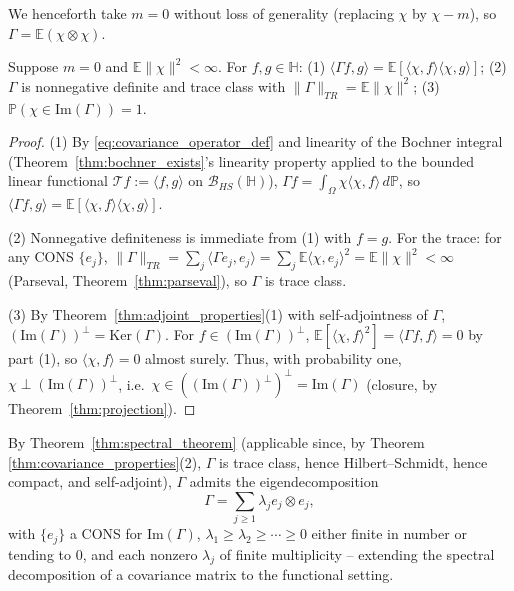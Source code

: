 We henceforth take $m=0$ without loss of generality (replacing $\chi$ by
$\chi-m$), so $\Gamma=\mathbb{E}(\chi\otimes\chi)$.

\begin{theorem}
\label{thm:covariance_properties}
Suppose $m=0$ and $\mathbb{E}\|\chi\|^2<\infty$. For $f,g\in\mathbb{H}$:
(1) $\langle\Gamma f,g\rangle = \mathbb{E}[\langle\chi,f\rangle\langle
\chi,g\rangle]$; (2) $\Gamma$ is nonnegative definite and trace class with
$\|\Gamma\|_{TR}=\mathbb{E}\|\chi\|^2$; (3) $\mathbb{P}(\chi\in
\mathrm{Im}(\Gamma))=1$.
\end{theorem}

\begin{proof}
(1) By \eqref{eq:covariance_operator_def} and linearity of the Bochner
integral (Theorem~\ref{thm:bochner_exists}'s linearity property applied to
the bounded linear functional $\mathcal{T}f:=\langle f,g\rangle$ on
$\mathcal{B}_{HS}(\mathbb{H})$), $\Gamma f = \int_\Omega\chi\langle\chi,f
\rangle\,d\mathbb{P}$, so $\langle\Gamma f,g\rangle = \mathbb{E}[\langle
\chi,f\rangle\langle\chi,g\rangle]$.

(2) Nonnegative definiteness is immediate from (1) with $f=g$. For the
trace: for any CONS $\{e_j\}$, $\|\Gamma\|_{TR} = \sum_j\langle\Gamma e_j,
e_j\rangle = \sum_j\mathbb{E}\langle\chi,e_j\rangle^2 = \mathbb{E}\|\chi
\|^2<\infty$ (Parseval, Theorem~\ref{thm:parseval}), so $\Gamma$ is trace
class.

(3) By Theorem~\ref{thm:adjoint_properties}(1) with self-adjointness of
$\Gamma$, $(\mathrm{Im}(\Gamma))^\perp = \mathrm{Ker}(\Gamma)$. For $f\in
(\mathrm{Im}(\Gamma))^\perp$, $\mathbb{E}[\langle\chi,f\rangle^2] =
\langle\Gamma f,f\rangle=0$ by part (1), so $\langle\chi,f\rangle=0$
almost surely. Thus, with probability one, $\chi\perp(\mathrm{Im}
(\Gamma))^\perp$, i.e.\ $\chi\in((\mathrm{Im}(\Gamma))^\perp)^\perp =
\mathrm{Im}(\Gamma)$ (closure, by Theorem~\ref{thm:projection}).
\end{proof}

By Theorem~\ref{thm:spectral_theorem} (applicable since, by Theorem
\ref{thm:covariance_properties}(2), $\Gamma$ is trace class, hence
Hilbert--Schmidt, hence compact, and self-adjoint), $\Gamma$ admits the
eigendecomposition
\begin{equation}
\Gamma = \sum_{j\geq 1}\lambda_je_j\otimes e_j,
\label{eq:covariance_eigendecomp}
\end{equation}
with $\{e_j\}$ a CONS for $\mathrm{Im}(\Gamma)$, $\lambda_1\geq\lambda_2
\geq\cdots\geq 0$ either finite in number or tending to $0$, and each
nonzero $\lambda_j$ of finite multiplicity -- extending the spectral
decomposition of a covariance matrix to the functional setting.

